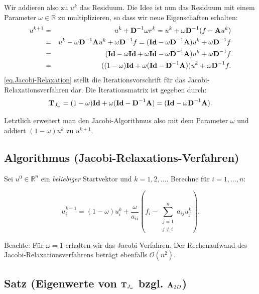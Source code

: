 Wir addieren also zu $u^{k}$ das Residuum. Die Idee ist nun das Residuum mit einem Parameter $\omega \in \mathbb{R}$ zu multiplizieren, so dass wir neue Eigenschaften erhalten:
\begin{eqnarray}
u^{k+1} &=& u^{k} + {\textbf{D}}^{-1} \omega r^{k} = u^{k} + \omega {\textbf{D}}^{-1} (f - {\textbf{A}}u^{k}) \notag \\
&=& u^{k} - \omega {\textbf{D}}^{-1} {\textbf{A}}u^{k} + \omega {\textbf{D}}^{-1}f = ({\textbf{Id}} - \omega {\textbf{D}}^{-1} {\textbf{A}})u^{k} + \omega {\textbf{D}}^{-1}f \notag \\
&=& ({\textbf{Id}} - \omega {\textbf{Id}} + \omega {\textbf{Id}} - \omega {\textbf{D}}^{-1} {\textbf{A}})u^{k} + \omega {\textbf{D}}^{-1}f \notag \\
&=& ((1 - \omega){\textbf{Id}} + \omega({\textbf{Id}} - {\textbf{D}}^{-1}{\textbf{A}})) u^{k} + \omega {\textbf{D}}^{-1}f.\label{eq.Jacobi-Relaxation}
\end{eqnarray}
\autoref{eq.Jacobi-Relaxation} stellt die Iterationsvorschrift für das Jacobi-Relaxationsverfahren dar. Die Iterationsmatrix ist gegeben durch:
\begin{equation}
{\textbf{T}}_{J_{\omega}} = (1 - \omega) {\textbf{Id}} + \omega({\textbf{Id}} - {\textbf{D}}^{-1} {\textbf{A}}) = ({\textbf{Id}} - \omega {\textbf{D}}^{-1} {\textbf{A}}).
\end{equation}

Letztlich erweitert man den Jacobi-Algorithmus also mit dem Parameter $\omega$ und addiert $(1 - \omega)u^{k}$ zu $u^{k+1}$.

\subsection{Algorithmus (Jacobi-Relaxations-Verfahren)}\label{ss.Algorithmus Jacobi Relax}

Sei $u^{0} \in \mathbb{R}^{n}$ ein \textit{beliebiger} Startvektor und $k=1,2,...$. Berechne für $i=1,...,n$:

\begin{equation}
u^{k+1}_{i} = (1 - \omega)u^{k}_{i} + \frac {\omega} {a_{ii}} (f_{i} - \sum_{\substack{j = 1 \\ j \ne i}}^{n} a_{ij}u^{k}_{j}).
\end{equation}

Beachte: Für $\omega = 1$ erhalten wir das Jacobi-Verfahren. Der Rechenaufwand des Jacobi-Relaxationsverfahrens beträgt ebenfalls $\mathcal{O}(n^{2})$.

\subsection{Satz (Eigenwerte von ${\textbf{T}}_{J_{\omega}}$ bzgl. ${\textbf{A}}_{2D}$)}\label{ss.EW Relax}

